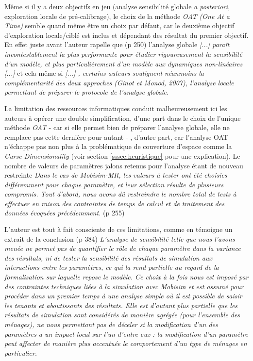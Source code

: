 {Même si il y a deux objectifs en jeu (analyse sensibilité globale \textit{a posteriori}, exploration locale de pré-calibrage), le choix de la méthode \textit{OAT (One At a Time)} semble quand même être un choix par défaut, car le deuxième objectif d'exploration locale/ciblé est inclus et dépendant des résultat du premier objectif. En effet juste avant l'auteur rapelle que (p 250) l'analyse globale \textit{[...] paraît incontestablement la plus performante pour étudier rigoureusement la sensibilité d’un modèle, et plus particulièrement d’un modèle aux dynamiques non-linéaires [...]} et cela même si \textit{ [...] , certains auteurs soulignent néanmoins la complémentarité des deux approches (Ginot et Monod, 2007), l’analyse locale permettant de préparer le protocole de l’analyse globale.}

La limitation des ressources informatiques conduit malheureusement ici les auteurs à opérer une double simplification, d'une part dans le choix de l'unique méthode \textit{OAT} - car si elle permet bien de préparer l'analyse globale, elle ne remplace pas cette dernière pour autant - , d'autre part, car l'analyse OAT n'échappe pas non plus à la problématique de couverture d'espace comme la \textit{Curse Dimensionality} (voir section \ref{sssec:heuristique} pour une explication). Le nombre de valeurs de paramètres jalons retenus pour l'analyse étant de nouveau restreinte \textit{Dans le cas de Mobisim-MR, les valeurs à tester ont été choisies différemment pour chaque paramètre, et leur sélection résulte de plusieurs compromis. Tout d’abord, nous avons dû restreindre le nombre total de tests à effectuer en raison des contraintes de temps de calcul et de traitement des données évoquées précédemment.} (p 255)

L'auteur est tout à fait consciente de ces limitations, comme en témoigne un extrait de la conclusion (p 384) \textit{L’analyse de sensibilité telle que nous l’avons menée ne permet pas de quantifier le rôle de chaque paramètre dans la variance des résultats, ni de tester la sensibilité des résultats de simulation aux interactions entre les paramètres, ce qui la rend partielle au regard de la formalisation sur laquelle repose le modèle. Ce choix à la fois nous est imposé par des contraintes techniques liées à la simulation avec Mobisim et est assumé pour procéder dans un premier temps à une analyse simple où il est possible de saisir les tenants et aboutissants des résultats. Elle est d’autant plus partielle que les résultats de simulation sont considérés de manière agrégée (pour l’ensemble des ménages), ne nous permettant pas de déceler si la modification d’un des paramètres a un impact local sur l’un d’entre eux : la modification d’un paramètre peut affecter de manière plus accentuée le comportement d’un type de ménages en particulier.}

}
